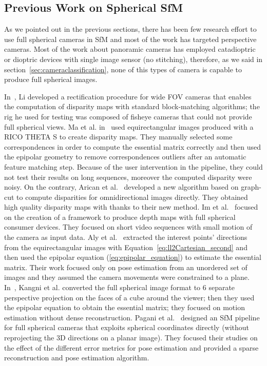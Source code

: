 \subsection{Previous Work on Spherical SfM}
\label{subsec:related_work}
As we pointed out in the previous sections, there has been few research 
effort to use full spherical cameras in SfM and most of the work
has targeted perspective cameras.
Most of the work about panoramic cameras has employed catadioptric or dioptric 
devices with single image sensor (no stitching), therefore, as we said in 
section~\ref{sec:cameraclassification}, none of this types of camera is capable
to produce full spherical images.

In~\cite{li2008binocular,li2006real}, Li developed a rectification procedure for wide
FOV cameras that enables the computation of disparity maps with standard 
block-matching algorithms; the rig he used for testing was composed of 
fisheye cameras that could not provide full spherical views.
Ma et al. in~\cite{ma20153d} used equirectangular images produced with a 
RICO THETA S to create disparity maps. They manually selected some 
correspondences in order to compute the essential matrix correctly and then 
used the epipolar geometry to remove correspondences outliers after an 
automatic feature matching step. Because of the user intervention in 
the pipeline, they could not test their results on long sequences, moreover the
computed disparity were noisy.
On the contrary, Arican et al.~\cite{arican2007dense} developed a new algorithm
based on graph-cut to compute disparities for omnidirectional images directly.
They obtained high quality disparity maps with thanks to their new method.
Im et al.~\cite{im2016all} focused on the creation of a framework to produce
depth maps 
with full spherical consumer devices. They focused on short video sequences 
with small motion of the camera as input data.
Aly et al.~\cite{aly2012street} extracted the interest points' directions from the
equirectangular 
images with Equation~\ref{eq:ll2Cartesian_second} and then used the 
epipolar equation (\ref{eq:epipolar_equation}) to estimate the essential matrix.
Their work focused only on pose estimation from an unordered set of images
and they assumed the camera movements were constrained to a plane.
In~\cite{kangni2007orientation}, Kangni et al. converted the full spherical image format to 6 
separate perspective projection on the faces of a cube around the viewer; 
then they used the epipolar equation to obtain the essential matrix;
they focused on motion estimation without dense reconstruction.
Pagani et al.~\cite{pagani2011structure} designed an SfM pipeline for full
spherical cameras that exploits spherical coordinates directly (without 
reprojecting the 3D directions on a planar image). They focused their studies on
the effect of the different error metrics for pose estimation and provided a 
sparse reconstruction and pose estimation algorithm.

